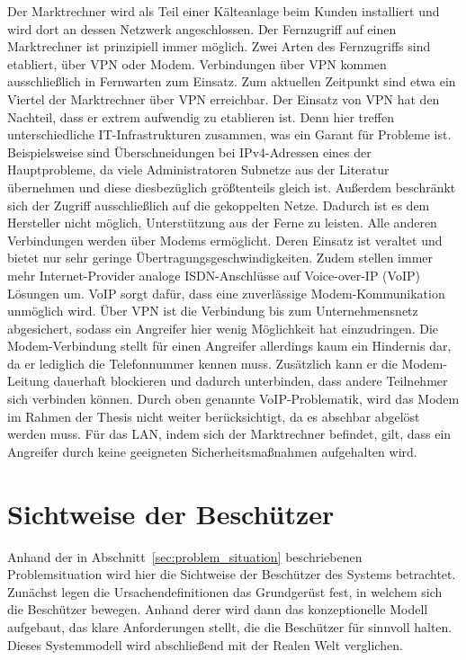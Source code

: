 \documentclass[11pt,a4paper]{report}
\begin{document}
Der Marktrechner wird als Teil einer Kälteanlage beim Kunden installiert und wird dort an dessen Netzwerk angeschlossen. Der Fernzugriff auf einen Marktrechner ist prinzipiell immer möglich. Zwei Arten des Fernzugriffs sind etabliert, über VPN oder Modem. Verbindungen über VPN kommen ausschließlich in Fernwarten zum Einsatz. Zum aktuellen Zeitpunkt sind etwa ein Viertel der Marktrechner über VPN erreichbar. Der Einsatz von VPN hat den Nachteil, dass er extrem aufwendig zu etablieren ist. Denn hier treffen unterschiedliche IT-Infrastrukturen zusammen, was ein Garant für Probleme ist. Beispielsweise sind Überschneidungen bei IPv4-Adressen eines der Hauptprobleme, da viele Administratoren Subnetze aus der Literatur übernehmen und diese diesbezüglich größtenteils gleich ist. Außerdem beschränkt sich der Zugriff ausschließlich auf die gekoppelten Netze. Dadurch ist es dem Hersteller nicht möglich, Unterstützung aus der Ferne zu leisten. Alle anderen Verbindungen werden über Modems ermöglicht. Deren Einsatz ist veraltet und bietet nur sehr geringe Übertragungsgeschwindigkeiten. Zudem stellen immer mehr Internet-Provider analoge ISDN-Anschlüsse auf Voice-over-IP (VoIP) Lösungen um. VoIP sorgt dafür, dass eine zuverlässige Modem-Kommunikation unmöglich wird. Über VPN ist die Verbindung bis zum Unternehmensnetz abgesichert, sodass ein Angreifer hier wenig Möglichkeit hat einzudringen. Die Modem-Verbindung stellt für einen Angreifer allerdings kaum ein Hindernis dar, da er lediglich die Telefonnummer kennen muss. Zusätzlich kann er die Modem-Leitung dauerhaft blockieren und dadurch unterbinden, dass andere Teilnehmer sich verbinden können. Durch oben genannte VoIP-Problematik, wird das Modem im Rahmen der Thesis nicht weiter berücksichtigt, da es absehbar abgelöst werden muss. Für das LAN, indem sich der Marktrechner befindet, gilt, dass ein Angreifer durch keine geeigneten Sicherheitsmaßnahmen aufgehalten wird.

\section{Sichtweise der Beschützer} 

Anhand der in Abschnitt~\ref{sec:problem_situation} beschriebenen Problemsituation wird hier die Sichtweise der Beschützer des Systems betrachtet. Zunächst legen die Ursachendefinitionen das Grundgerüst fest, in welchem sich die Beschützer bewegen. Anhand derer wird dann das konzeptionelle Modell aufgebaut, das klare Anforderungen stellt, die die Beschützer für sinnvoll halten. Dieses Systemmodell wird abschließend mit der Realen Welt verglichen.
\end{document}
